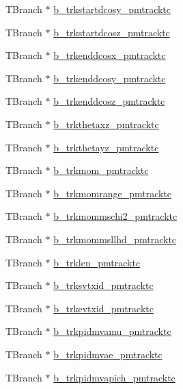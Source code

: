 \begin{DoxyCompactItemize}
\item 
T\-Branch $\ast$ \hyperlink{classanatree_af971449f44d1c957d3ca5326802a2f2e}{b\-\_\-trkstartdcosy\-\_\-pmtracktc}
\item 
T\-Branch $\ast$ \hyperlink{classanatree_a80c4ec66cae13c13119a3cad1f936895}{b\-\_\-trkstartdcosz\-\_\-pmtracktc}
\item 
T\-Branch $\ast$ \hyperlink{classanatree_ac712ef1b5e714989f0540877c0d84f97}{b\-\_\-trkenddcosx\-\_\-pmtracktc}
\item 
T\-Branch $\ast$ \hyperlink{classanatree_aa5a54f5da766c9944643c30760f64587}{b\-\_\-trkenddcosy\-\_\-pmtracktc}
\item 
T\-Branch $\ast$ \hyperlink{classanatree_a183f3cfaa5f6f42bfcb2dd3bd2df4b6e}{b\-\_\-trkenddcosz\-\_\-pmtracktc}
\item 
T\-Branch $\ast$ \hyperlink{classanatree_ad561c76632d04b70faf906487ada62c0}{b\-\_\-trkthetaxz\-\_\-pmtracktc}
\item 
T\-Branch $\ast$ \hyperlink{classanatree_ac15e5e08a57990892d1d7c2111982582}{b\-\_\-trkthetayz\-\_\-pmtracktc}
\item 
T\-Branch $\ast$ \hyperlink{classanatree_a782d889f8b5fd1d352b9b4d352f84da5}{b\-\_\-trkmom\-\_\-pmtracktc}
\item 
T\-Branch $\ast$ \hyperlink{classanatree_af743e149aff2e5acfebeaa5eb5678f2e}{b\-\_\-trkmomrange\-\_\-pmtracktc}
\item 
T\-Branch $\ast$ \hyperlink{classanatree_a52bb4b42ce9fd4bb175aa0a3c167cea5}{b\-\_\-trkmommschi2\-\_\-pmtracktc}
\item 
T\-Branch $\ast$ \hyperlink{classanatree_a038535f7a00f8049c3306b2119740fb3}{b\-\_\-trkmommsllhd\-\_\-pmtracktc}
\item 
T\-Branch $\ast$ \hyperlink{classanatree_a7636779ee5c4ddab49691d7521b58b16}{b\-\_\-trklen\-\_\-pmtracktc}
\item 
T\-Branch $\ast$ \hyperlink{classanatree_a802135c7ee1cf361df7b99cf3207c32f}{b\-\_\-trksvtxid\-\_\-pmtracktc}
\item 
T\-Branch $\ast$ \hyperlink{classanatree_af64608e06d4076adbcf587984592b2c5}{b\-\_\-trkevtxid\-\_\-pmtracktc}
\item 
T\-Branch $\ast$ \hyperlink{classanatree_a394abe52ad153a5137d9dca3e4b56ec1}{b\-\_\-trkpidmvamu\-\_\-pmtracktc}
\item 
T\-Branch $\ast$ \hyperlink{classanatree_afbc92e232adad53f05343e58a8eeaa3c}{b\-\_\-trkpidmvae\-\_\-pmtracktc}
\item 
T\-Branch $\ast$ \hyperlink{classanatree_a1ad2a2007476b2b42c034b99317105ac}{b\-\_\-trkpidmvapich\-\_\-pmtracktc}

\end{DoxyCompactItemize}
